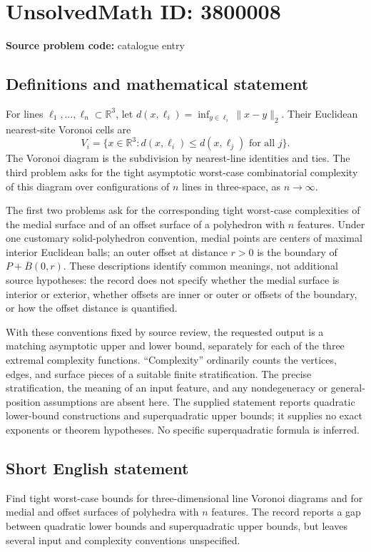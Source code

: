 \documentclass[11pt]{article}
\newcommand{\R}{\mathbb{R}}
\begin{document}
\section*{UnsolvedMath ID: 3800008}
\textbf{Source problem code:} catalogue entry
\subsection{Definitions and mathematical statement}
For lines $\ell_1,\ldots,\ell_n\subset\R^3$, let $d(x,\ell_i)=\inf_{y\in\ell_i}\|x-y\|_2$. Their Euclidean nearest-site Voronoi cells are
\[
V_i=\{x\in\R^3:d(x,\ell_i)\leq d(x,\ell_j)\text{ for all }j\}.
\]
The Voronoi diagram is the subdivision by nearest-line identities and ties. The third problem asks for the tight asymptotic worst-case combinatorial complexity of this diagram over configurations of $n$ lines in three-space, as $n\to\infty$.

The first two problems ask for the corresponding tight worst-case complexities of the medial surface and of an offset surface of a polyhedron with $n$ features. Under one customary solid-polyhedron convention, medial points are centers of maximal interior Euclidean balls; an outer offset at distance $r>0$ is the boundary of $P+\overline B(0,r)$. These descriptions identify common meanings, not additional source hypotheses: the record does not specify whether the medial surface is interior or exterior, whether offsets are inner or outer or offsets of the boundary, or how the offset distance is quantified.

With these conventions fixed by source review, the requested output is a matching asymptotic upper and lower bound, separately for each of the three extremal complexity functions. ``Complexity'' ordinarily counts the vertices, edges, and surface pieces of a suitable finite stratification. The precise stratification, the meaning of an input feature, and any nondegeneracy or general-position assumptions are absent here. The supplied statement reports quadratic lower-bound constructions and superquadratic upper bounds; it supplies no exact exponents or theorem hypotheses. No specific superquadratic formula is inferred.
\subsection{Short English statement}
Find tight worst-case bounds for three-dimensional line Voronoi diagrams and for medial and offset surfaces of polyhedra with $n$ features. The record reports a gap between quadratic lower bounds and superquadratic upper bounds, but leaves several input and complexity conventions unspecified.
\end{document}

